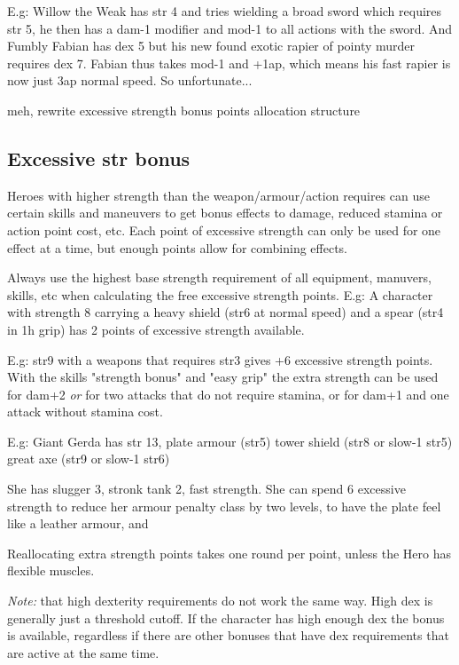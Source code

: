 E.g: Willow the Weak has str 4 and tries wielding a broad sword which requires str 5, he then has a dam-1 modifier and mod-1 to all actions with the sword.
And Fumbly Fabian has dex 5 but his new found exotic rapier of pointy murder requires dex 7. Fabian thus takes mod-1 and +1ap, which means his fast rapier is now just 3ap normal speed. So unfortunate...


\vspace{10mm}
\TODO meh, rewrite excessive strength bonus points allocation structure
\subsection*{Excessive str bonus}
Heroes with higher strength than the weapon/armour/action requires can use certain skills and maneuvers to get bonus effects to damage, reduced stamina or action point cost, etc. Each point of excessive strength can only be used for one effect at a time, but enough points allow for combining effects.

Always use the highest base strength requirement of all equipment, manuvers, skills, etc when calculating the free excessive strength points.
E.g: A character with strength 8 carrying a heavy shield (str6 at normal speed) and a spear (str4 in 1h grip) has 2 points of excessive strength available.

E.g: str9 with a weapons that requires str3 gives +6 excessive strength points. With the skills "strength bonus" and "easy grip" the extra strength can be used for dam+2 \emph{or} for two attacks that do not require stamina, or for dam+1 and one attack without stamina cost.

E.g: Giant Gerda has str 13, 
plate armour (str5)
tower shield (str8 or slow-1 str5)
great axe (str9 or slow-1 str6)


She has slugger 3, stronk tank 2, fast strength.
She can spend 6 excessive strength to reduce her armour penalty class by two levels, to have the plate feel like a leather armour, and 

Reallocating extra strength points takes one round per point, unless the Hero has flexible muscles.

\emph{Note:} that high dexterity requirements do not work the same way. High dex is generally just a threshold cutoff. If the character has high enough dex the bonus is available, regardless if there are other bonuses that have dex requirements that are active at the same time.


